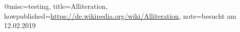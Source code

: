 @misc={testing,
	title={Alliteration},
	howpublished={\url{https://de.wikipedia.org/wiki/Alliteration}},
	note={besucht am 12.02.2019}
}
